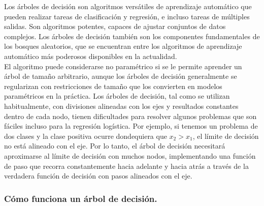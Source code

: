 Los árboles de decisión son algoritmos versátiles de aprendizaje automático que pueden 
realizar tareas de clasificación y regresión, e incluso tareas de múltiples salidas. Son 
algoritmos potentes, capaces de ajustar conjuntos de datos complejos. Los árboles de decisión 
también son los componentes fundamentales de los bosques aleatorios, que se encuentran entre 
los algoritmos de aprendizaje automático más poderosos disponibles en la 
actualidad. \cite{géron2022hands}\\ 

El algoritmo puede considerarse no paramétrico si se le permite aprender un árbol de tamaño 
arbitrario, aunque los árboles de decisión generalmente se regularizan con restricciones de 
tamaño que los convierten en modelos paramétricos en la práctica. Los árboles de decisión, 
tal como se utilizan habitualmente, con divisiones alineadas con los ejes y resultados 
constantes dentro de cada nodo, tienen dificultades para resolver algunos problemas que son 
fáciles incluso para la regresión logística. Por ejemplo, si tenemos un problema de dos 
clases y la clase positiva ocurre dondequiera que $x_2 > x_1$, el límite de decisión no 
está alineado con el eje. Por lo tanto, el árbol de decisión necesitará aproximarse al 
límite de decisión con muchos nodos, implementando una función de paso que recorra 
constantemente hacia adelante y hacia atrás a través de la verdadera función de decisión 
con pasos alineados con el eje. \cite{Goodfellow-et-al-2016}

\subsubsection*{Cómo funciona un árbol de decisión.}

